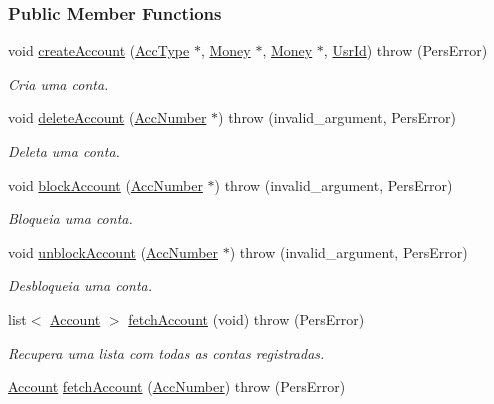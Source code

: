 \subsubsection*{Public Member Functions}
\begin{DoxyCompactItemize}
\item 
void \hyperlink{classStubUserAccAdm_ad6104bb252dd2627c42b65c47d026021}{create\-Account} (\hyperlink{classUsrType}{Acc\-Type} $\ast$, \hyperlink{classMoney}{Money} $\ast$, \hyperlink{classMoney}{Money} $\ast$, \hyperlink{classUsrId}{Usr\-Id})  throw (\-Pers\-Error)
\begin{DoxyCompactList}\small\item\em Cria uma conta. \end{DoxyCompactList}\item 
void \hyperlink{classStubUserAccAdm_a6e95d2e9e35d658e581742e2d5e2fb60}{delete\-Account} (\hyperlink{classAccNumber}{Acc\-Number} $\ast$)  throw (invalid\-\_\-argument, Pers\-Error)
\begin{DoxyCompactList}\small\item\em Deleta uma conta. \end{DoxyCompactList}\item 
void \hyperlink{classStubUserAccAdm_ac13ca4505d670a7bbb7c75d01b41a6d7}{block\-Account} (\hyperlink{classAccNumber}{Acc\-Number} $\ast$)  throw (invalid\-\_\-argument, Pers\-Error)
\begin{DoxyCompactList}\small\item\em Bloqueia uma conta. \end{DoxyCompactList}\item 
void \hyperlink{classStubUserAccAdm_ad21405e80f7a8a2ea6a094363d4819d4}{unblock\-Account} (\hyperlink{classAccNumber}{Acc\-Number} $\ast$)  throw (invalid\-\_\-argument, Pers\-Error)
\begin{DoxyCompactList}\small\item\em Desbloqueia uma conta. \end{DoxyCompactList}\item 
list$<$ \hyperlink{classAccount}{Account} $>$ \hyperlink{classStubUserAccAdm_a29ba751355628d3e3a7ef1596b9b5108}{fetch\-Account} (void)  throw (\-Pers\-Error)
\begin{DoxyCompactList}\small\item\em Recupera uma lista com todas as contas registradas. \end{DoxyCompactList}\item 
\hyperlink{classAccount}{Account} \hyperlink{classStubUserAccAdm_a05a1719f0ebfe4a2a7aed81505c82aba}{fetch\-Account} (\hyperlink{classAccNumber}{Acc\-Number})  throw (\-Pers\-Error)

\end{DoxyCompactItemize}
